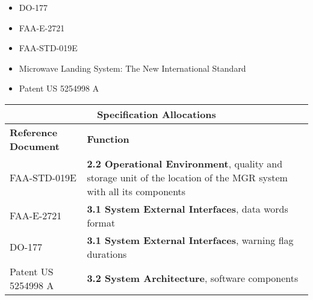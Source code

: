 \documentclass[11pt]{article}
\begin{document}
        \begin{itemize}

            \item DO-177

            \item FAA-E-2721

            \item FAA-STD-019E

            \item Microwave Landing System: The New International Standard

            \item Patent US 5254998 A

        \end{itemize}




        \renewcommand{\arraystretch}{1.2}
        \setlength{\tabcolsep}{0.3cm}

        \centering
        \begin{tabular}{ |p{5cm}|p{11cm}| }
            \hline
                \multicolumn{2}{|c|}{\textbf{Specification Allocations}} \\
            \hline
                \textbf{Reference Document} & \textbf{Function} \\
            \hline

                FAA-STD-019E & \textbf{2.2 Operational Environment}, quality and storage unit of the location of the MGR system with all its components \\

                FAA-E-2721 & \textbf{3.1 System External Interfaces}, data words format \\

                DO-177 & \textbf{3.1 System External Interfaces}, warning flag durations \\

                Patent US 5254998 A & \textbf{3.2 System Architecture}, software components \\

            \hline
        \end{tabular}
\end{document}
